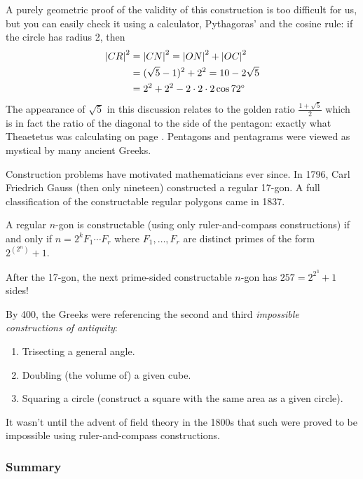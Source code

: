 A purely geometric proof of the validity of this construction is too difficult for us, but you can easily check it using a calculator, Pythagoras' and the cosine rule: if the circle has radius 2, then
\begin{align*}
	\nm{CR}^2 &=\nm{CN}^2
	=\nm{ON}^2+\nm{OC}^2\\
	&=(\sqrt 5-1)^2+2^2=10-2\sqrt 5\\ 
	&=2^2+2^2-2\cdot 2\cdot 2\cos\ang{72}
\end{align*}
The appearance of $\sqrt 5$ in this discussion relates to the golden ratio $\frac{1+\sqrt 5}2$ which is in fact the ratio of the diagonal to the side of the pentagon: exactly what Theaetetus was calculating on page \pageref{ex:theaetetus}. Pentagons and pentagrams were viewed as mystical by many ancient Greeks.\bigbreak

Construction problems have motivated mathematicians ever since. In 1796, Carl Friedrich Gauss (then only nineteen) constructed a regular 17-gon. A full classification of the constructable regular polygons came in 1837.

\begin{thm*}{}{}
	A regular $n$-gon is constructable (using only ruler-and-compass constructions) if and only if $n=2^kF_1\cdots F_r$ where $F_1,\ldots,F_r$ are distinct primes of the form $2^{(2^n)}+1$.
\end{thm*}

After the 17-gon, the next prime-sided constructable $n$-gon has $257=2^{2^3}+1$ sides!\medbreak

By 400\BC, the Greeks were referencing the second and third \emph{impossible constructions of antiquity}:
\begin{enumerate}
  \item Trisecting a general angle.
  \item Doubling (the volume of) a given cube.
  \item Squaring a circle (construct a square with the same area as a given circle).\footnotemark
\end{enumerate}
It wasn't until the advent of field theory in the 1800s that such were proved to be impossible using ruler-and-compass constructions.



\subsubsection*{Summary}

